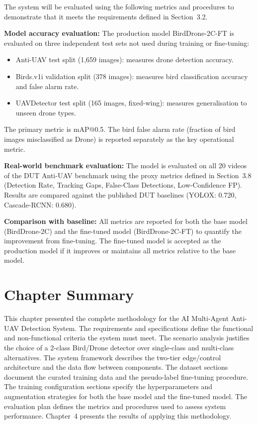 \documentclass[12pt,a4paper]{report}
\begin{document}
The system will be evaluated using the following metrics and procedures to
demonstrate that it meets the requirements defined in Section~3.2.

\textbf{Model accuracy evaluation:}
The production model BirdDrone-2C-FT is evaluated on three independent
test sets not used during training or fine-tuning:
\begin{itemize}
  \item Anti-UAV test split (1,659 images): measures drone detection accuracy.
  \item Birds.v1i validation split (378 images): measures bird classification
        accuracy and false alarm rate.
  \item UAVDetector test split (165 images, fixed-wing): measures
        generalisation to unseen drone types.
\end{itemize}
The primary metric is mAP@0.5. The bird false alarm rate (fraction of bird
images misclassified as Drone) is reported separately as the key operational
metric.

\textbf{Real-world benchmark evaluation:}
The model is evaluated on all 20 videos of the DUT Anti-UAV benchmark
using the proxy metrics defined in Section~3.8 (Detection Rate, Tracking
Gaps, False-Class Detections, Low-Confidence FP). Results are compared
against the published DUT baselines (YOLOX: 0.720, Cascade-RCNN: 0.680).

\textbf{Comparison with baseline:}
All metrics are reported for both the base model (BirdDrone-2C) and the
fine-tuned model (BirdDrone-2C-FT) to quantify the improvement from
fine-tuning. The fine-tuned model is accepted as the production model
if it improves or maintains all metrics relative to the base model.

\section{Chapter Summary}

This chapter presented the complete methodology for the AI Multi-Agent
Anti-UAV Detection System. The requirements and specifications define
the functional and non-functional criteria the system must meet. The
scenario analysis justifies the choice of a 2-class Bird/Drone detector
over single-class and multi-class alternatives. The system framework
describes the two-tier edge/control architecture and the data flow
between components. The dataset sections document the curated training
data and the pseudo-label fine-tuning procedure. The training configuration
sections specify the hyperparameters and augmentation strategies for both
the base model and the fine-tuned model. The evaluation plan defines the
metrics and procedures used to assess system performance. Chapter~4
presents the results of applying this methodology.
\end{document}
